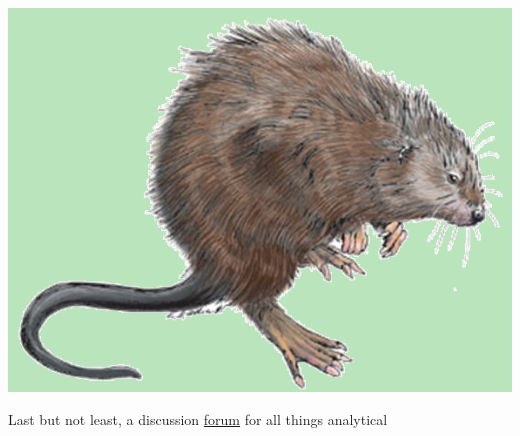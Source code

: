 \documentclass[serif]{beamer}\usepackage[]{graphicx}\usepackage[]{color}
\begin{document}
\begin{frame}[fragile]{\includegraphics[width=0.05\paperwidth]{fig/muskrat.png}\hspace{0.07in}{\bf SWMPrats.net: Forum}}
\centerline{Last but not least, a discussion \href{http://swmprats.net/forum}{forum} for all things analytical}
\vspace{0.2in}
\centerline{}
\end{frame}
\end{document}
